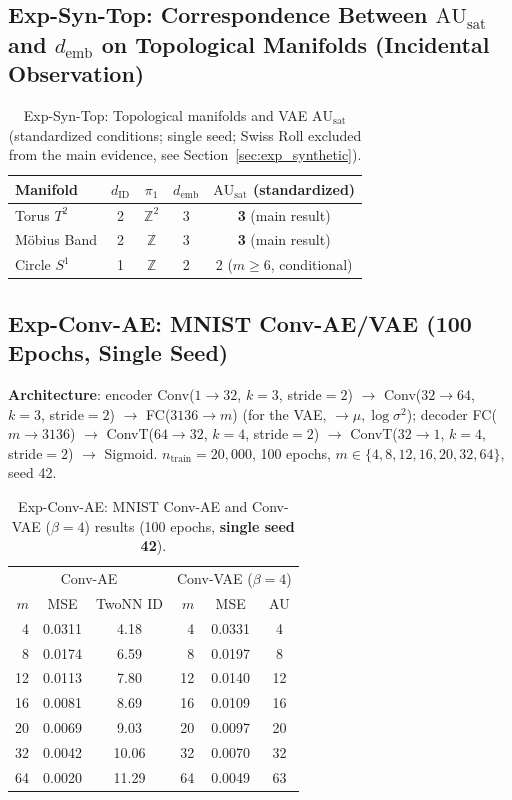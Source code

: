 \documentclass[make,article,submit,pdftex,moreauthors]{Definitions/mdpi}
\newcommand{\dID}{d_{\mathrm{ID}}}
\newcommand{\AUsat}{\mathrm{AU}_{\mathrm{sat}}}
\newcommand{\demb}{d_{\mathrm{emb}}}
\begin{document}
\subsection*{Exp-Syn-Top: Correspondence Between $\AUsat$ and $\demb$ on Topological Manifolds (Incidental Observation)}

\begin{table}[H]
\centering
\caption{Exp-Syn-Top: Topological manifolds and VAE $\AUsat$ (standardized conditions; single seed; Swiss Roll excluded from the main evidence, see Section~\ref{sec:exp_synthetic}).}
\label{tab:eb_summary}
\small
\begin{tabular}{lcccc}
\toprule
Manifold & $\dID$ & $\pi_1$ & $\demb$ & $\AUsat$ (standardized) \\
\midrule
Torus $T^2$  & 2 & $\mathbb{Z}^2$ & 3 & \textbf{3} (main result) \\
M\"obius Band  & 2 & $\mathbb{Z}$   & 3 & \textbf{3} (main result) \\
Circle $S^1$ & 1 & $\mathbb{Z}$   & 2 & 2 ($m \geq 6$, conditional) \\
\bottomrule
\end{tabular}
\end{table}

\subsection*{Exp-Conv-AE: MNIST Conv-AE/VAE (100 Epochs, Single Seed)}

\textbf{Architecture}:
encoder Conv($1\to32$, $k=3$, stride$=2$) $\to$ Conv($32\to64$, $k=3$, stride$=2$)
$\to$ FC($3136\to m$) (for the VAE, $\to \mu, \log\sigma^2$);
decoder FC($m\to3136$) $\to$ ConvT($64\to32$, $k=4$, stride$=2$) $\to$
ConvT($32\to1$, $k=4$, stride$=2$) $\to$ Sigmoid.
$n_{\mathrm{train}} = 20{,}000$, 100 epochs, $m \in \{4, 8, 12, 16, 20, 32, 64\}$, seed 42.

\begin{table}[H]
\centering
\caption{Exp-Conv-AE: MNIST Conv-AE and Conv-VAE ($\beta=4$) results (100 epochs, \textbf{single seed 42}).}
\label{tab:eg}
\small
\begin{tabular}{rcc|rcc}
\toprule
\multicolumn{3}{c|}{Conv-AE} & \multicolumn{3}{c}{Conv-VAE ($\beta=4$)} \\
$m$ & MSE & TwoNN ID & $m$ & MSE & AU \\
\midrule
 4  & 0.0311 & 4.18  &  4  & 0.0331 &  4 \\
 8  & 0.0174 & 6.59  &  8  & 0.0197 &  8 \\
12  & 0.0113 & 7.80  & 12  & 0.0140 & 12 \\
16  & 0.0081 & 8.69  & 16  & 0.0109 & 16 \\
20  & 0.0069 & 9.03  & 20  & 0.0097 & 20 \\
32  & 0.0042 & 10.06 & 32  & 0.0070 & 32 \\
64  & 0.0020 & 11.29 & 64  & 0.0049 & 63 \\
\bottomrule
\end{tabular}
\end{table}
\end{document}
